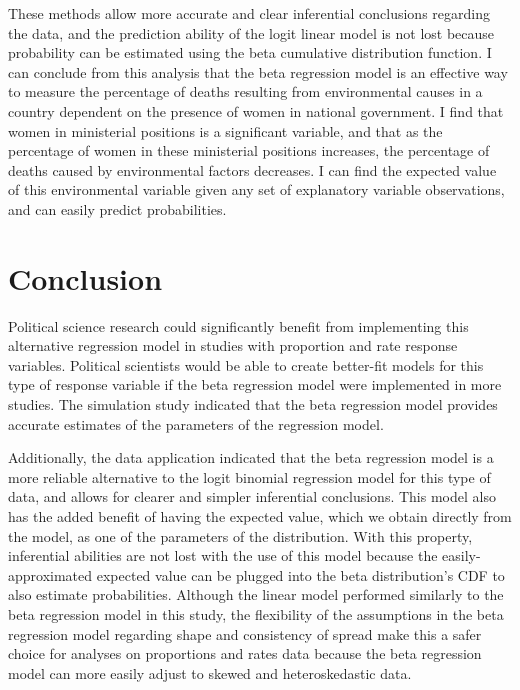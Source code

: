 \documentclass{svproc}
\begin{document}
These methods allow more accurate and clear inferential conclusions regarding the data, and the prediction ability of the logit linear model is not lost because probability can be estimated using the beta cumulative distribution function. I can conclude from this analysis that the beta regression model is an effective way to measure the percentage of deaths resulting from environmental causes in a country dependent on the presence of women in national government. I find that women in ministerial positions is a significant variable, and that as the percentage of women in these ministerial positions increases, the percentage of deaths caused by environmental factors decreases. I can find the expected value of this environmental variable given any set of explanatory variable observations, and can easily predict probabilities. 

\section{Conclusion}

Political science research could significantly benefit from implementing this alternative regression model in studies with proportion and rate response variables. Political scientists would be able to create better-fit models for this type of response variable if the beta regression model were implemented in more studies. The simulation study indicated that the beta regression model provides accurate estimates of the parameters of the regression model. 

Additionally, the data application indicated that the beta regression model is a more reliable alternative to the logit binomial regression model for this type of data, and allows for clearer and simpler inferential conclusions. This model also has the added benefit of having the expected value, which we obtain directly from the model, as one of the parameters of the distribution. With this property, inferential abilities are not lost with the use of this model because the easily-approximated expected value can be plugged into the beta distribution's CDF to also estimate probabilities. Although the linear model performed similarly to the beta regression model in this study, the flexibility of the assumptions in the beta regression model regarding shape and consistency of spread make this a safer choice for analyses on proportions and rates data because the beta regression model can more easily adjust to skewed and heteroskedastic data.

\clearpage
\end{document}
